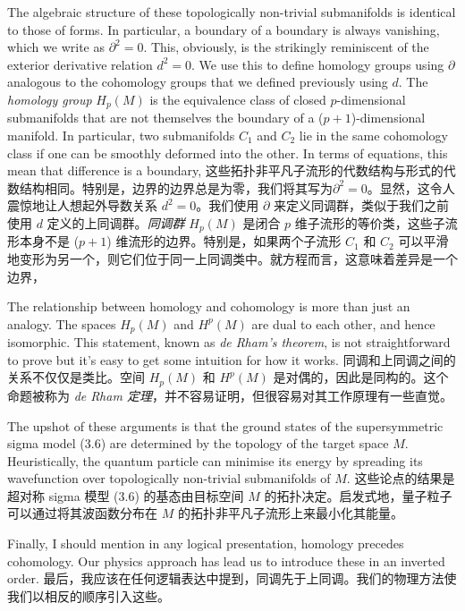 \documentclass{ctexart}
\begin{document}
\begin{paracol}{2}
The algebraic structure of these topologically non-trivial submanifolds is identical to those of forms. In particular, a boundary of a boundary is always vanishing, which we write as $\partial^2 = 0$. This, obviously, is the strikingly reminiscent of the exterior derivative relation $d^2 = 0$. We use this to define homology groups using $\partial$ analogous to the cohomology groups that we defined previously using $d$. The \textit{homology group} $H_p(M)$ is the equivalence class of closed $p$-dimensional submanifolds that are not themselves the boundary of a ($p+1$)-dimensional manifold. In particular, two submanifolds $C_1$ and $C_2$ lie in the same cohomology class if one can be smoothly deformed into the other. In terms of equations, this mean that difference is a boundary,
\switchcolumn
这些拓扑非平凡子流形的代数结构与形式的代数结构相同。特别是，边界的边界总是为零，我们将其写为$\partial^2 = 0$。显然，这令人震惊地让人想起外导数关系 $d^2 = 0$。我们使用 $\partial$ 来定义同调群，类似于我们之前使用 $d$ 定义的上同调群。\textit{同调群} $H_p(M)$ 是闭合 $p$ 维子流形的等价类，这些子流形本身不是 ($p+1$) 维流形的边界。特别是，如果两个子流形 $C_1$ 和 $C_2$ 可以平滑地变形为另一个，则它们位于同一上同调类中。就方程而言，这意味着差异是一个边界，
\switchcolumn*

The relationship between homology and cohomology is more than just an analogy. The spaces $H_p(M)$ and $H^p(M)$ are dual to each other, and hence isomorphic. This statement, known as \textit{de Rham’s theorem}, is not straightforward to prove but it’s easy to get some intuition for how it works.
\switchcolumn
同调和上同调之间的关系不仅仅是类比。空间 $H_p(M)$ 和 $H^p(M)$ 是对偶的，因此是同构的。这个命题被称为 \textit{de Rham 定理}，并不容易证明，但很容易对其工作原理有一些直觉。
\switchcolumn*

The upshot of these arguments is that the ground states of the supersymmetric sigma model (3.6) are determined by the topology of the target space $M$. Heuristically, the quantum particle can minimise its energy by spreading its wavefunction over topologically non-trivial submanifolds of $M$.
\switchcolumn
这些论点的结果是超对称 sigma 模型 (3.6) 的基态由目标空间 $M$ 的拓扑决定。启发式地，量子粒子可以通过将其波函数分布在 $M$ 的拓扑非平凡子流形上来最小化其能量。
\switchcolumn*

Finally, I should mention in any logical presentation, homology precedes cohomology. Our physics approach has lead us to introduce these in an inverted order.
\switchcolumn
最后，我应该在任何逻辑表达中提到，同调先于上同调。我们的物理方法使我们以相反的顺序引入这些。
\switchcolumn*


\end{paracol}
\end{document}
